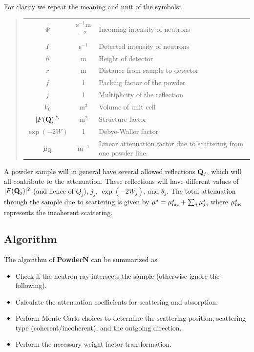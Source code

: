 For clarity we repeat the meaning and unit of the symbols:
%
\begin{quote}\begin{tabular}{ccl}
$\Psi$ & s$^{-1}$m$^{-2}$ & Incoming intensity of neutrons \\
$I$    & s$^{-1}$ & Detected intensity of neutrons \\
$h$    & m        & Height of detector \\
$r$    & m        & Distance from sample to detector \\
$f$    & 1        & Packing factor of the powder \\
$j$    & 1        & Multiplicity of the reflection \\
$V_0$  & m$^{3}$  & Volume of unit cell\\
$|F({\bf Q})|^2$ & m$^2$  & Structure factor \\
$\exp(-2W)$ & 1  & Debye-Waller factor \\
$\mu_{\rm Q}$ & m$^{-1}$ & Linear attenuation factor due to scattering from
one powder line. \\
\end{tabular}\end{quote}
%

A powder sample will in general have several allowed reflections
${\bf Q}_j$, which will all contribute to the attenuation.
These reflections will have different values of
$|F({\bf Q}_j)|^2$ (and hence of $Q_j$), $j_j$, $\exp(-2W_j)$,
and $\theta_j$.
The total attenuation through the sample due to scattering is given by
$\mu^s = \mu_{\rm inc}^s + \sum_j \mu^s_j $,
where $\mu_{\rm inc}^s$ represents the incoherent scattering.

\subsection{Algorithm}
The algorithm of {\bf PowderN} can be summarized as
\begin{itemize}
\item Check if the neutron ray intersects the sample (otherwise ignore
the following).
\item Calculate the attenuation coefficients for scattering and absorption.
\item Perform Monte Carlo choices to determine the scattering position,
scattering type (coherent/incoherent), and the outgoing direction.
\item Perform the necessary weight factor transformation.
\end{itemize}


